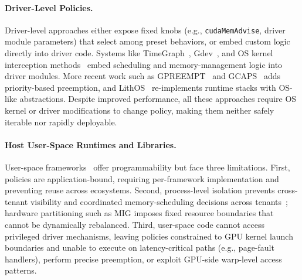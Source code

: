\paragraph{Driver-Level Policies.}
Driver-level approaches either expose fixed knobs (e.g., \texttt{cudaMemAdvise}, driver module parameters) that select among preset behaviors, or embed custom logic directly into driver code. Systems like TimeGraph~\cite{kato2011timegraph}, Gdev~\cite{kato2012gdev}, and OS kernel interception methods~\cite{kernelintercept} embed scheduling and memory-management logic into driver modules. More recent work such as GPREEMPT~\cite{fan2025gpreempt} and GCAPS~\cite{wang2024gcaps} adds priority-based preemption, and LithOS~\cite{coppock2025lithos} re-implements runtime stacks with OS-like abstractions. Despite improved performance, all these approaches require OS kernel or driver modifications to change policy, making them neither safely iterable nor rapidly deployable.

\paragraph{Host User-Space Runtimes and Libraries.}
User-space frameworks~\cite{ng2023paella,gim2025pie,shen2025xsched,chen2025ktransformers,coppock2025lithos} offer programmability but face three limitations. First, policies are application-bound, requiring per-framework implementation and preventing reuse across ecosystems. Second, process-level isolation prevents cross-tenant visibility and coordinated memory-scheduling decisions across tenants~\cite{xiao2018gandiva,yu2020fine}; hardware partitioning such as MIG imposes fixed resource boundaries that cannot be dynamically rebalanced. Third, user-space code cannot access privileged driver mechanisms, leaving policies constrained to GPU kernel launch boundaries and unable to execute on latency-critical paths (e.g., page-fault handlers), perform precise preemption, or exploit GPU-side warp-level access patterns.

